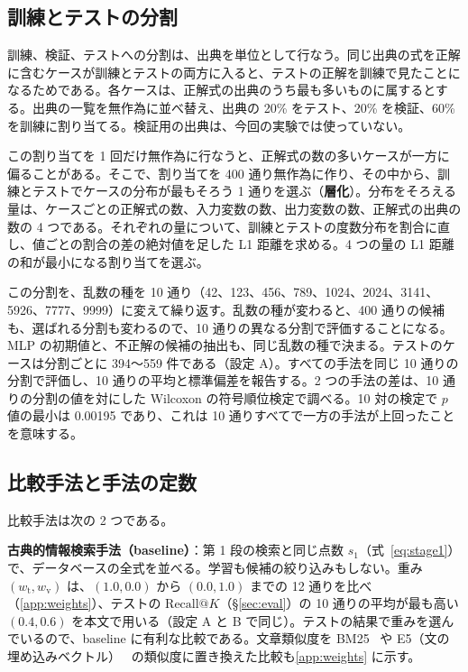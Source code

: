 \documentclass[a4j,dvipdfmx,11pt]{jresume}
\makeatletter
\newcommand{\rk}{\textrm{Recall@}K}
\makeatother
\begin{document}
\subsection{訓練とテストの分割}\label{sec:split}
訓練、検証、テストへの分割は、出典を単位として行なう。同じ出典の式を正解に含むケースが訓練とテストの両方に入ると、テストの正解を訓練で見たことになるためである。各ケースは、正解式の出典のうち最も多いものに属するとする。出典の一覧を無作為に並べ替え、出典の 20\% をテスト、20\% を検証、60\% を訓練に割り当てる。検証用の出典は、今回の実験では使っていない。

この割り当てを 1 回だけ無作為に行なうと、正解式の数の多いケースが一方に偏ることがある。そこで、割り当てを 400 通り無作為に作り、その中から、訓練とテストでケースの分布が最もそろう 1 通りを選ぶ（\textbf{層化}）。分布をそろえる量は、ケースごとの正解式の数、入力変数の数、出力変数の数、正解式の出典の数の 4 つである。それぞれの量について、訓練とテストの度数分布を割合に直し、値ごとの割合の差の絶対値を足した L1 距離を求める。4 つの量の L1 距離の和が最小になる割り当てを選ぶ。

この分割を、乱数の種を 10 通り（42、123、456、789、1024、2024、3141、5926、7777、9999）に変えて繰り返す。乱数の種が変わると、400 通りの候補も、選ばれる分割も変わるので、10 通りの異なる分割で評価することになる。MLP の初期値と、不正解の候補の抽出も、同じ乱数の種で決まる。テストのケースは分割ごとに 394〜559 件である（設定 A）。すべての手法を同じ 10 通りの分割で評価し、10 通りの平均と標準偏差を報告する。2 つの手法の差は、10 通りの分割の値を対にした Wilcoxon の符号順位検定で調べる。10 対の検定で $p$ 値の最小は 0.00195 であり、これは 10 通りすべてで一方の手法が上回ったことを意味する。

\subsection{比較手法と手法の定数}\label{sec:compared}
比較手法は次の 2 つである。

\textbf{古典的情報検索手法（baseline）}：第 1 段の検索と同じ点数 $s_1$（式~\eqref{eq:stage1}）で、データベースの全式を並べる。学習も候補の絞り込みもしない。重み $(w_{\mathrm{t}}, w_{\mathrm{v}})$ は、$(1.0, 0.0)$ から $(0.0, 1.0)$ までの 12 通りを比べ（\ref{app:weights}）、テストの $\rk$（\S\ref{sec:eval}）の 10 通りの平均が最も高い $(0.4, 0.6)$ を本文で用いる（設定 A と B で同じ）。テストの結果で重みを選んでいるので、baseline に有利な比較である。文章類似度を BM25~\citep{BM25} や E5（文の埋め込みベクトル）~\citep{E5} の類似度に置き換えた比較も\ref{app:weights} に示す。
\end{document}
